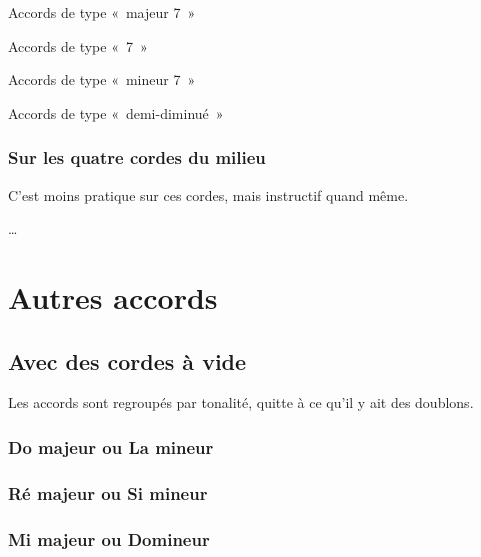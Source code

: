 \documentclass[11pt]{article}
\begin{document}
Accords de type «~majeur 7~»


Accords de type «~7~»


Accords de type «~mineur 7~»


Accords de type «~demi-diminué~»


\subsubsection{Sur les quatre cordes du milieu}

C’est moins pratique sur ces cordes, mais instructif quand même.

\ldots

\section{Autres accords}

\subsection{Avec des cordes à vide}

Les accords sont regroupés par tonalité, quitte à ce qu’il y ait des doublons.

\subsubsection{Do majeur ou La mineur}


\subsubsection{Ré majeur ou Si mineur}


\subsubsection{Mi majeur ou Do\shrp mineur}
\end{document}
